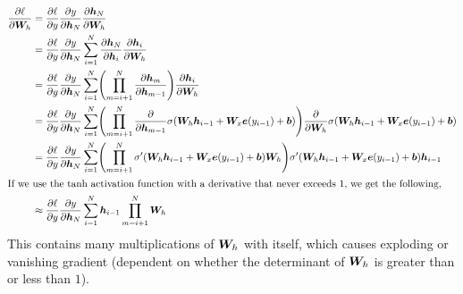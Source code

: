 \begin{align*}
  \pdv{\ell}{\mat{W}_h} &= \pdv{\ell}{y} \pdv{y}{\vec{h}_N} \pdv{\vec{h}_N}{\mat{W}_h} \\
  &= \pdv{\ell}{y} \pdv{y}{\vec{h}_N} \sum_{i=1}^N \pdv{\vec{h}_N}{\vec{h}_i} \pdv{\vec{h}_i}{\mat{W}_h} \\
  &= \pdv{\ell}{y} \pdv{y}{\vec{h}_N} \sum_{i=1}^N \lft( \prod_{m=i+1}^N \pdv{\vec{h}_m}{\vec{h}_{m-1}} \rgt) \pdv{\vec{h}_i}{\mat{W}_h} \\
  &= \pdv{\ell}{y} \pdv{y}{\vec{h}_N} \sum_{i=1}^N \lft( \prod_{m=i+1}^N
  \pdv*{\sigma\lft( \mat{W}_h\vec{h}_{i-1} + \mat{W}_x\vec{e}(y_{i-1}) + \vec{b} \rgt)}{\vec{h}_{m-1}} \rgt)
  \pdv*{\sigma \lft( \mat{W}_h\vec{h}_{i-1} + \mat{W}_x\vec{e}(y_{i-1}) + \vec{b} \rgt)}{\mat{W}_h} \\
  &= \pdv{\ell}{y} \pdv{y}{\vec{h}_N} \sum_{i=1}^N \lft( \prod_{m=i+1}^N \sigma' \lft( \mat{W}_h\vec{h}_{i-1} + \mat{W}_x\vec{e}(y_{i-1}) + \vec{b} \rgt) \mat{W}_h \rgt) \sigma'\lft( \mat{W}_h\vec{h}_{i-1} + \mat{W}_x\vec{e}(y_{i-1}) + \vec{b}\rgt) \vec{h}_{i-1} \\
  \intertext{If we use the $\tanh$ activation function with a derivative that
  never exceeds 1, we get the following,}
  &\approx \pdv{\ell}{y} \pdv{y}{\vec{h}_N} \sum_{i=1}^N \vec{h}_{i-1} \prod_{m=i+1}^N \mat{W}_h \\
\end{align*}
This contains many multiplications of $\bm{W}_h$ with itself, which causes
exploding or vanishing gradient (dependent on whether the determinant of
$\bm{W}_h$ is greater than or less than $1$).
